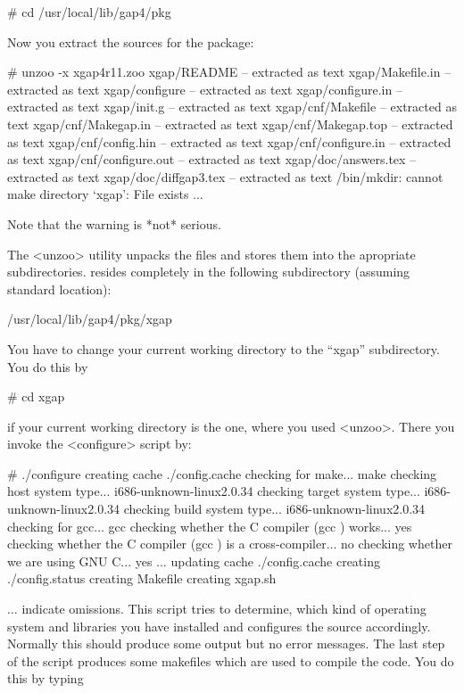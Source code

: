 \begintt
# cd /usr/local/lib/gap4/pkg
\endtt

Now you extract the sources for the {\XGAP} package:

\begintt
# unzoo -x xgap4r11.zoo
xgap/README     -- extracted as text
xgap/Makefile.in        -- extracted as text
xgap/configure  -- extracted as text
xgap/configure.in       -- extracted as text
xgap/init.g     -- extracted as text
xgap/cnf/Makefile       -- extracted as text
xgap/cnf/Makegap.in     -- extracted as text
xgap/cnf/Makegap.top    -- extracted as text
xgap/cnf/config.hin     -- extracted as text
xgap/cnf/configure.in   -- extracted as text
xgap/cnf/configure.out  -- extracted as text
xgap/doc/answers.tex    -- extracted as text
xgap/doc/diffgap3.tex   -- extracted as text
/bin/mkdir: cannot make directory `xgap': File exists
...
\endtt

Note that the warning is *not* serious.

The <unzoo> utility unpacks the files and stores them into the apropriate
subdirectories. {\XGAP} resides completely in the following subdirectory
(assuming standard location):

\begintt
/usr/local/lib/gap4/pkg/xgap
\endtt


You have to change your current working directory to the ``xgap''
subdirectory. You do this by

\begintt
# cd xgap
\endtt

if your current working directory is the one, where you used
<unzoo>. There you invoke the <configure> script by:

\begintt
# ./configure
creating cache ./config.cache
checking for make... make
checking host system type... i686-unknown-linux2.0.34
checking target system type... i686-unknown-linux2.0.34
checking build system type... i686-unknown-linux2.0.34
checking for gcc... gcc
checking whether the C compiler (gcc  ) works... yes
checking whether the C compiler (gcc  ) is a cross-compiler... no
checking whether we are using GNU C... yes
...
updating cache ./config.cache
creating ./config.status
creating Makefile
creating xgap.sh
\endtt

$\ldots$ indicate omissions. 
This script tries to determine, which kind of operating system and
libraries you have installed and configures the source
accordingly. Normally this should produce some output but no error
messages. The last step of the script produces some makefiles which are
used to compile the code. You do this by typing

